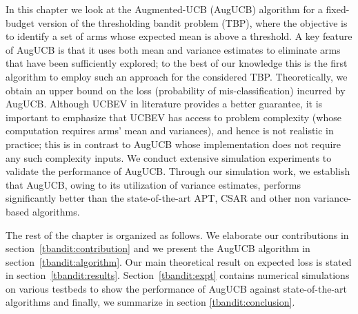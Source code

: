 In this chapter we look at the Augmented-UCB (AugUCB) algorithm for a fixed-budget version of the thresholding bandit problem (TBP), where the objective is to identify a set of arms whose expected mean is above a threshold. A key feature of AugUCB is that it uses both mean and variance estimates to eliminate arms that have been sufficiently explored; to the best of our knowledge this is the first algorithm to employ such an approach for the considered TBP.  Theoretically, we obtain an upper bound on the loss (probability of mis-classification) incurred by AugUCB. Although UCBEV in literature provides a better guarantee, it is important to emphasize that UCBEV has access to problem complexity (whose computation requires arms' mean and variances), and hence is not realistic in practice; this is in contrast to AugUCB whose implementation does not require any such complexity inputs. We conduct extensive simulation experiments to validate the performance of AugUCB. Through our simulation work, we establish that AugUCB, owing to its utilization of variance estimates, performs significantly better than the state-of-the-art APT, CSAR and other non variance-based algorithms.

The rest of the chapter is organized as follows. We elaborate our contributions in section~\ref{tbandit:contribution} and  we present the AugUCB algorithm in section~\ref{tbandit:algorithm}. Our main theoretical result on expected loss is stated in section~\ref{tbandit:results}. Section~\ref{tbandit:expt} contains numerical simulations on various testbeds to show the performance of AugUCB against state-of-the-art algorithms and finally, we summarize in section \ref{tbandit:conclusion}.